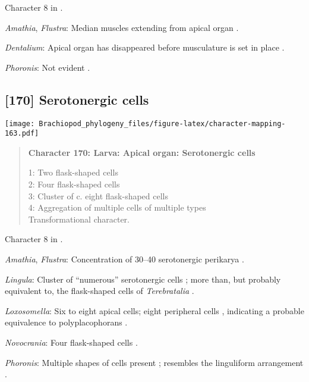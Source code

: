 \documentclass[openany]{book}
\theoremstyle{definition}
\theoremstyle{definition}
\theoremstyle{definition}
\theoremstyle{remark}
\begin{document}
Character 8 in \citet{Vinther2008}.

\hypertarget{Amathia-coding-169}{}
\emph{Amathia}, \emph{Flustra}: Median muscles extending from apical
organ \citep{Gruhl2008}.

\hypertarget{Dentalium-coding-169}{}
\emph{Dentalium}: Apical organ has disappeared before musculature is set
in place \citep{Wanninger2002M}.

\hypertarget{Phoronis-coding-169}{}
\emph{Phoronis}: Not evident \citep[fig. 2C]{Santagata2004}.

\subsection*{{[}170{]} Serotonergic cells}\label{serotonergic-cells}

\texttt{[image: Brachiopod\_phylogeny\_files/figure-latex/character-mapping-163.pdf]}

\begin{quote}
\textbf{Character 170: Larva: Apical organ: Serotonergic cells}

1: Two flask-shaped cells\\
2: Four flask-shaped cells\\
3: Cluster of c. eight flask-shaped cells\\
4: Aggregation of multiple cells of multiple types\\
Transformational character.
\end{quote}

Character 8 in \citet{Haszprunar2008}.

\hypertarget{Amathia-coding-170}{}
\emph{Amathia}, \emph{Flustra}: Concentration of 30--40 serotonergic
perikarya \citep[in \emph{Fredericella};][]{Gruhl2010F}.

\hypertarget{Lingula-coding-170}{}
\emph{Lingula}: Cluster of ``numerous'' serotonergic cells
\citep{HaySchmidt1992, Altenburger2010}; more than, but probably
equivalent to, the flask-shaped cells of \emph{Terebratalia}
\citep{Luter2016}.

\hypertarget{Loxosomella-coding-170}{}
\emph{Loxosomella}: Six to eight apical cells; eight peripheral cells
\citep{Wanninger2007}, indicating a probable equivalence to
polyplacophorans \citep{Haszprunar2008}.

\hypertarget{Novocrania-coding-170}{}
\emph{Novocrania}: Four flask-shaped cells \citep{Altenburger2010}.

\hypertarget{Phoronis-coding-170}{}
\emph{Phoronis}: Multiple shapes of cells present \citep{Santagata2002};
resembles the linguliform arrangement \citep{Altenburger2010}.
\end{document}

